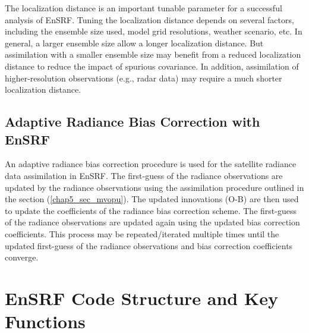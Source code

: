 The localization distance is an important tunable parameter for a successful analysis of EnSRF. Tuning the localization distance depends on several factors, including the ensemble size used, model grid resolutions, weather scenario, etc. In general, a larger ensemble size allow a longer localization distance. But assimilation with a smaller ensemble size may benefit from a reduced localization distance to reduce the impact of spurious covariance. In addition, assimilation of higher-resolution observations  (e.g., radar data) may require a much shorter localization distance.

\subsection{Adaptive Radiance Bias Correction with EnSRF}
An adaptive radiance bias correction procedure is used for the satellite radiance data assimilation in EnSRF. The first-guess of the radiance observations are updated by the radiance observations using the assimilation procedure outlined in the section (\ref{chap5_sec_mvopu}). The updated innovations (O-B) are then used to update the coefficients of the radiance bias correction scheme. The first-guess of the radiance observations are updated again using the updated bias correction coefficients. This process may be repeated/iterated multiple times until the updated first-guess of the radiance observations and bias correction coefficients converge.



\section{EnSRF Code Structure and Key Functions}
